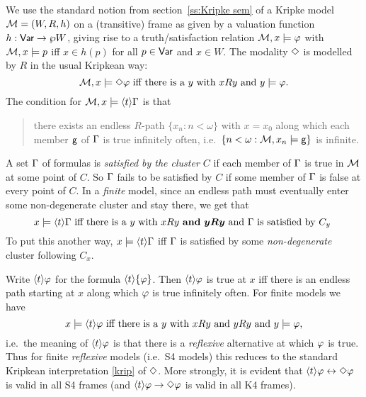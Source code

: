   We use the standard notion from section~\ref{ss:Kripke sem} of a Kripke model $\mathcal{M}=(W,R,h)$  on a (transitive) frame as given by a valuation function $h:\mathsf{Var}\to\wp W$, giving rise to a truth/satisfaction relation $\mathcal{M},x\models\varphi$ with $\mathcal{M},x\models p$ iff $x\in h(p)$ for all $p\in\mathsf{Var}$ and $x\in W$.
The modality $\Diamond$ is modelled by $R$ in the usual Kripkean way:
\begin{equation}\label{krip}
 \text{$\M,x\models\Dim\ph$ iff there is a $y$ with $xRy$ and $y\models \ph$.}
 \end{equation} 
 The condition for $\mathcal{M},x\models\langle t\rangle\Gamma$ is that
 \begin{quote}
there exists an endless $R$-path $\{x_n:n<\omega\}$ with $x=x_0$
along which each member ${\sf g}$ of $\Gamma$ is true infinitely often, i.e.\ $\{n<\omega:\mathcal{M},x_n\models{\sf g}\}$ is infinite.
\end{quote}
 A set $\Gamma$ of formulas is  \emph{satisfied by the cluster $C$} if  each member of $\Gamma$ is true in $\mathcal{M}$ at some point of $C$.  So $\Gamma$ fails to be satisfied by $C$ if some member of $\Gamma$ is false at every point of $C$.  In a \emph{finite} model,
 since an endless path must eventually enter some non-degenerate cluster  and stay there,
  we get that 
 \begin{equation}\label{semants}
 \text{$x\models\Di\G$ iff there is a $y$ with $xRy$ \textbf{and} {\boldmath{$yRy$}} and $\G$ is satisfied by $C_y$ }
 \end{equation}
To put this another way, $x\models\langle t\rangle\Gamma$ iff $\Gamma$ is satisfied by some \emph{non-degenerate} cluster following $C_x$.
 
Write $\langle t\rangle\varphi$ for the formula $\langle t\rangle\{\varphi\}$. Then $\langle t\rangle\varphi$ is true at $x$ iff there is an endless path starting at $x$ along which $\varphi$ is true infinitely often. For finite models we have
\begin{equation*}\label{}
 \text{$x\models\Di\ph$ iff there is a $y$ with $xRy$ and $yRy$ and $y\models \ph$,}
 \end{equation*}
 i.e.\ the meaning of $\langle t\rangle\varphi$ is that there is a \emph{reflexive} alternative at which $\varphi$ is true.
Thus for finite \emph{reflexive} models (i.e.\ S4 models) this reduces to the standard Kripkean interpretation  \eqref{krip} of $\Diamond$. More strongly, it is evident that $\langle t\rangle\varphi\leftrightarrow\Diamond\varphi$ is valid in all S4 frames (and $\langle t\rangle\varphi\to\Diamond\varphi$ is valid in all K4 frames).

